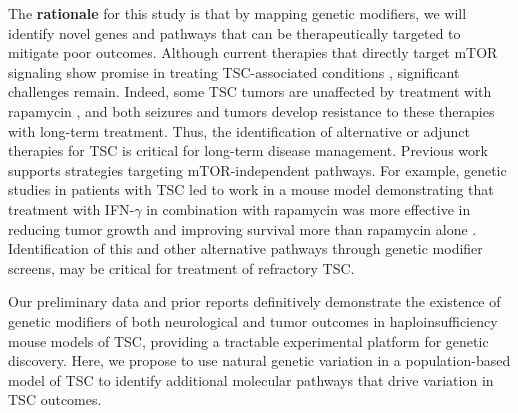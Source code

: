 \documentclass[
  12pt,
]{article}
\begin{document}
The \textbf{rationale} for this study is that by mapping genetic
modifiers, we will identify novel genes and pathways that can be
therapeutically targeted to mitigate poor outcomes. Although current
therapies that directly target mTOR signaling show promise in treating
TSC-associated conditions
\cite{30760308, 29438097, 30760308, 29438097, 15578690, 20235887},
significant challenges remain. Indeed, some TSC tumors are unaffected by
treatment with rapamycin
\cite{15557109, 20235887, 25347447, 24395886, 22457331}, and both
seizures \cite{30305233} and tumors \cite{36028490, 22788941} develop
resistance to these therapies with long-term treatment. Thus, the
identification of alternative or adjunct therapies for TSC is critical
for long-term disease management. Previous work supports strategies
targeting mTOR-independent pathways. For example, genetic studies in
patients with TSC led to work in a mouse model demonstrating that
treatment with IFN-\(\gamma\) in combination with rapamycin was more
effective in reducing tumor growth and improving survival more than
rapamycin alone \cite{16845661}. Identification of this and other
alternative pathways \cite{15150271, 16803888, 24395886, 23715154}
through genetic modifier screens, may be critical for treatment of
refractory TSC.

Our preliminary data and prior reports definitively demonstrate the
existence of genetic modifiers of both neurological and tumor outcomes
in haploinsufficiency mouse models of TSC, providing a tractable
experimental platform for genetic discovery. Here, we propose to use
natural genetic variation in a population-based model of TSC to identify
additional molecular pathways that drive variation in TSC outcomes.
\end{document}
